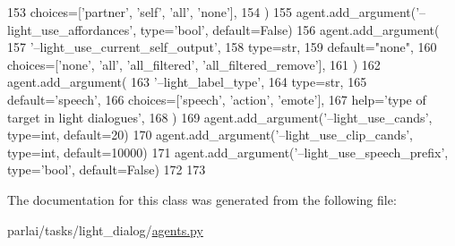 \begin{DoxyCode}
153             choices=[\textcolor{stringliteral}{'partner'}, \textcolor{stringliteral}{'self'}, \textcolor{stringliteral}{'all'}, \textcolor{stringliteral}{'none'}],
154         )
155         agent.add\_argument(\textcolor{stringliteral}{'--light\_use\_affordances'}, type=\textcolor{stringliteral}{'bool'}, default=\textcolor{keyword}{False})
156         agent.add\_argument(
157             \textcolor{stringliteral}{'--light\_use\_current\_self\_output'},
158             type=str,
159             default=\textcolor{stringliteral}{"none"},
160             choices=[\textcolor{stringliteral}{'none'}, \textcolor{stringliteral}{'all'}, \textcolor{stringliteral}{'all\_filtered'}, \textcolor{stringliteral}{'all\_filtered\_remove'}],
161         )
162         agent.add\_argument(
163             \textcolor{stringliteral}{'--light\_label\_type'},
164             type=str,
165             default=\textcolor{stringliteral}{'speech'},
166             choices=[\textcolor{stringliteral}{'speech'}, \textcolor{stringliteral}{'action'}, \textcolor{stringliteral}{'emote'}],
167             help=\textcolor{stringliteral}{'type of target in light dialogues'},
168         )
169         agent.add\_argument(\textcolor{stringliteral}{'--light\_use\_cands'}, type=int, default=20)
170         agent.add\_argument(\textcolor{stringliteral}{'--light\_use\_clip\_cands'}, type=int, default=10000)
171         agent.add\_argument(\textcolor{stringliteral}{'--light\_use\_speech\_prefix'}, type=\textcolor{stringliteral}{'bool'}, default=\textcolor{keyword}{False})
172 
173 
\end{DoxyCode}


The documentation for this class was generated from the following file\+:\begin{DoxyCompactItemize}
\item 
parlai/tasks/light\+\_\+dialog/\hyperlink{parlai_2tasks_2light__dialog_2agents_8py}{agents.\+py}\end{DoxyCompactItemize}
